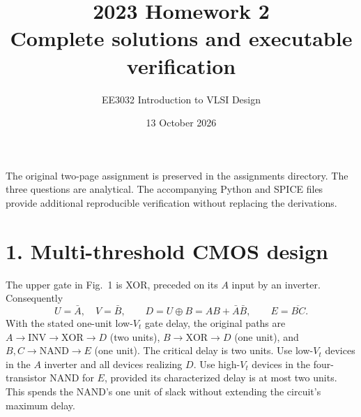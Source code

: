 \documentclass[11pt,a4paper]{article}
\title{2023 Homework 2\\Complete solutions and executable verification}
\author{EE3032 Introduction to VLSI Design}\date{13 October 2026}
\begin{document}
\maketitle
The original two-page assignment is preserved in the assignments directory.
The three questions are analytical. The accompanying Python and SPICE files
provide additional reproducible verification without replacing the derivations.

\section*{1. Multi-threshold CMOS design}
The upper gate in Fig.~1 is XOR, preceded on its $A$ input by an inverter.
Consequently
\[
 U=\bar A,\quad V=\bar B,\qquad
 \boxed{D=U\oplus B=AB+\bar A\bar B},\qquad
 \boxed{E=\overline{BC}}.
\]
With the stated one-unit low-$V_t$ gate delay, the original paths are
$A\to\mathrm{INV}\to\mathrm{XOR}\to D$ (two units),
$B\to\mathrm{XOR}\to D$ (one unit), and
$B,C\to\mathrm{NAND}\to E$ (one unit). The critical delay is two units.
Use low-$V_t$ devices in the $A$ inverter and all devices realizing $D$.
Use high-$V_t$ devices in the four-transistor NAND for $E$, provided its
characterized delay is at most two units. This spends the NAND's one unit
of slack without extending the circuit's maximum delay.
\end{document}
